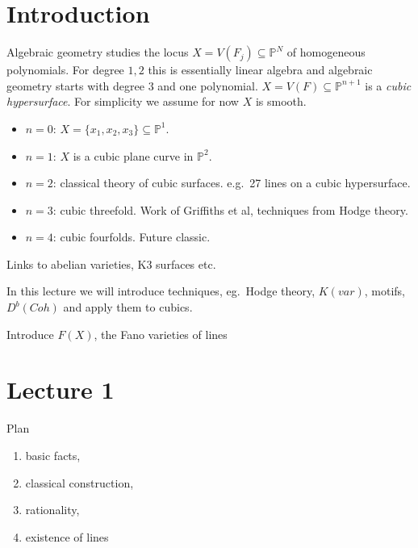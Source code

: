\documentclass[a4paper]{article}
\renewcommand*{\P}{\mathbb{P}}
\begin{document}


\tableofcontents

\setcounter{section}{-1}

\section{Introduction}

Algebraic geometry studies the locus \(X = V(F_j) \subseteq \P^N\) of homogeneous polynomials. For degree \(1, 2\) this is essentially linear algebra and algebraic geometry starts with degree \(3\) and one polynomial. \(X = V(F) \subseteq \P^{n + 1}\) is a \emph{cubic hypersurface}. For simplicity we assume for now \(X\) is smooth.

\begin{itemize}
\item \(n = 0\): \(X = \{x_1, x_2, x_3\} \subseteq \P^1\).
\item \(n = 1\): \(X\) is a cubic plane curve in \(\P^2\).
\item \(n = 2\): classical theory of cubic surfaces. e.g.\ 27 lines on a cubic hypersurface.
\item \(n = 3\): cubic threefold. Work of Griffiths et al, techniques from Hodge theory.
\item \(n = 4\): cubic fourfolds. Future classic.
\end{itemize}

Links to abelian varieties, K3 surfaces etc.

In this lecture we will introduce techniques, eg.\ Hodge theory, \(K(var)\), motifs, \(D^b(Coh)\) and apply them to cubics.

Introduce \(F(X)\), the Fano varieties of lines

\section{Lecture 1}

Plan
\begin{enumerate}
\item basic facts,
\item classical construction,
\item rationality,
\item existence of lines
\end{enumerate}
\end{document}
